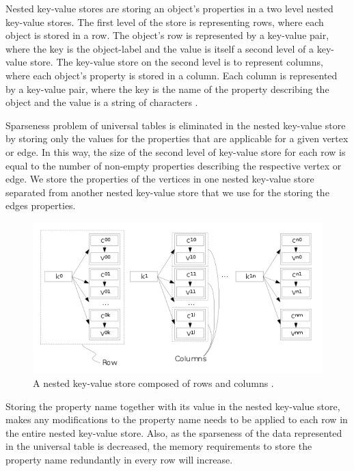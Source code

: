 {Nested key-value stores are storing an object's properties in a two level nested key-value stores. The first level of the store is representing rows, where each object is stored in a row. The object's row is represented by a key-value pair, where the key is the object-label and the value is itself a second level of a key-value store. The key-value store on the second level is to represent columns, where each object's property is stored in a column. Each column is represented by a key-value pair, where the key is the name of the property describing the object and the value is a string of characters \cite{ladwig2011cumulusrdf}.

Sparseness problem of universal tables is eliminated in the nested key-value store by storing only the values for the properties that are applicable for a given vertex or edge. In this way, the size of the second level of key-value store for each row is equal to the number of non-empty properties describing the respective vertex or edge. We store the properties of the vertices in one nested key-value store separated from another nested key-value store that we use for the storing the edges properties.


\begin{figure}[t]
\centering
\includegraphics[width=15cm]{pics/NestedKey-ValueStore.png}
\caption{A nested key-value store composed of rows and columns \cite{ladwig2011cumulusrdf}.}
\label{fig:nestedKey-ValueStore}
\end{figure} 

Storing the property name together with its value in the nested key-value store, makes any modifications to the property name needs to be applied to each row in the entire nested key-value store. Also, as the sparseness of the data represented in the universal table is decreased, the memory requirements to store the property name redundantly in every row will increase.

}
